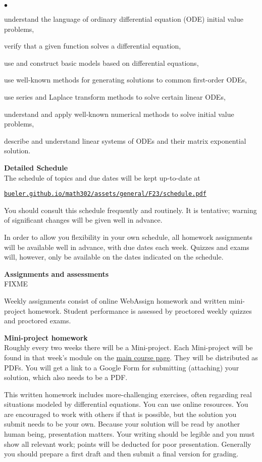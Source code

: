 \documentclass[12pt]{article}
\renewcommand{\emph}[1]{\textsf{\textbf{#1}}}
\newcommand{\localhead}[1]{\par\smallskip\textbf{#1}\nobreak\\}%
\def\heading#1{\localhead{\large\emph{#1}}}
\def\subheading#1{\localhead{\emph{#1}}}
\newenvironment{clist}%
{\bgroup\parskip 0pt\begin{list}{$\bullet$}{\partopsep 4pt\topsep 0pt\itemsep -2pt}}%
{\end{list}\egroup}%
\begin{document}
\begin{clist}
\item understand the language of ordinary differential equation (ODE) initial value problems,
\item verify that a given function solves a differential equation,
\item use and construct basic models based on differential equations,
\item use well-known methods for generating solutions to common first-order ODEs,
\item use series and Laplace transform methods to solve certain linear ODEs,
\item understand and apply well-known numerical methods to solve initial value problems,
\item describe and understand linear systems of ODEs and their matrix exponential solution.
\end{clist}


\heading{Detailed Schedule}
The schedule of topics and due dates will be kept up-to-date at

\smallskip
\centerline{\href{https://bueler.github.io/math302/assets/general/F23/schedule.pdf}{\tt bueler.github.io/math302/assets/general/F23/schedule.pdf}}

You should consult this schedule frequently and routinely.  It is tentative; warning of significant changes will be given well in advance.

In order to allow you flexibility in your own schedule, all homework assignments will be available well in advance, with due dates each week.  Quizzes and exams will, however, only be available on the dates indicated on the schedule.


\heading{Assignments and assessments}

FIXME

Weekly assignments consist of online WebAssign homework and written mini-project homework.  Student performance is assessed by proctored weekly quizzes and proctored exams.

\subheading{Mini-project homework}
Roughly every two weeks there will be a Mini-project.  Each Mini-project will be found in that week's module on the \href{https://bueler.github.io/math302/}{main course page}.  They will be distributed as PDFs.  You will get a link to a Google Form for submitting (attaching) your solution, which also needs to be a PDF.

This written homework includes more-challenging exercises, often regarding real situations modeled by differential equations.  You can use online resources.  You are encouraged to work with others if that is possible, but the solution you submit needs to be your own.  Because your solution will be read by another human being, presentation matters.  Your writing should be legible and you must show all relevant work; points will be deducted for poor presentation.  Generally you should prepare a first draft and then submit a final version for grading.
\end{document}
